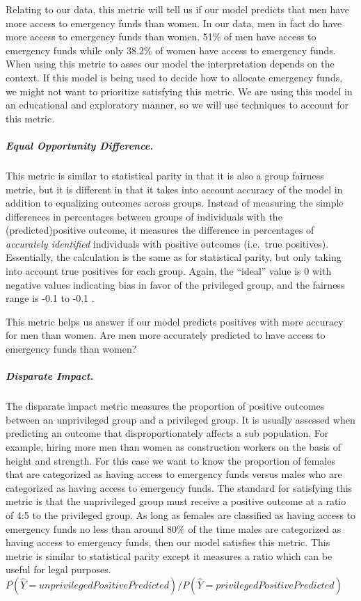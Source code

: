 \documentclass[water,article,submit,moreauthors,pdftex]{mdpi}
\begin{document}
Relating to our data, this metric will tell us if our model predicts
that men have more access to emergency funds than women. In our data,
men in fact do have more access to emergency funds than women. 51\% of
men have access to emergency funds while only 38.2\% of women have
access to emergency funds. When using this metric to asses our model the
interpretation depends on the context. If this model is being used to
decide how to allocate emergency funds, we might not want to prioritize
satisfying this metric. We are using this model in an educational and
exploratory manner, so we will use techniques to account for this
metric.

\hypertarget{equal-opportunity-difference.}{%
\subparagraph{Equal Opportunity
Difference.}\label{equal-opportunity-difference.}}

This metric is similar to statistical parity in that it is also a group
fairness metric, but it is different in that it takes into account
accuracy of the model in addition to equalizing outcomes across groups.
Instead of measuring the simple differences in percentages between
groups of individuals with the (predicted)positive outcome, it measures
the difference in percentages of \emph{accurately identified}
individuals with positive outcomes (i.e.~true positives). Essentially,
the calculation is the same as for statistical parity, but only taking
into account true positives for each group. Again, the ``ideal'' value
is 0 with negative values indicating bias in favor of the privileged
group, and the fairness range is -0.1 to -0.1 \citep{caton2020fairness}.

This metric helps us answer if our model predicts positives with more
accuracy for men than women. Are men more accurately predicted to have
access to emergency funds than women?

\hypertarget{disparate-impact.}{%
\subparagraph{Disparate Impact.}\label{disparate-impact.}}

The disparate impact metric measures the proportion of positive outcomes
between an unprivileged group and a privileged group. It is usually
assessed when predicting an outcome that disproportionately affects a
sub population. For example, hiring more men than women as construction
workers on the basis of height and strength. For this case we want to
know the proportion of females that are categorized as having access to
emergency funds versus males who are categorized as having access to
emergency funds. The standard for satisfying this metric is that the
unprivileged group must receive a positive outcome at a ratio of 4:5 to
the privileged group. As long as females are classified as having access
to emergency funds no less than around 80\% of the time males are
categorized as having access to emergency funds, then our model
satisfies this metric.\citep{caton2020fairness} This metric is similar
to statistical parity except it measures a ratio which can be useful for
legal purposes.
\(P(\hat{Y}=unprivilegedPositivePredicted) /P(\hat{Y}=privilegedPositivePredicted)\)
\end{document}
